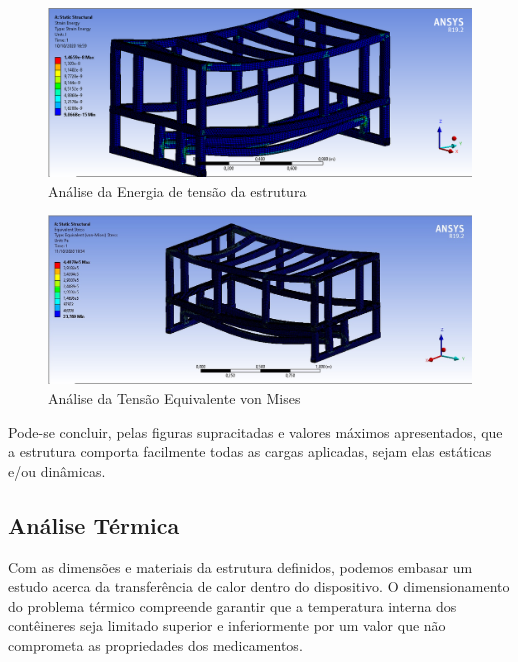 \begin{figure}[ht]
    \centering
    \includegraphics[width=1\textwidth]{figuras/estrutura/AnaliseEstaticaTubular/Energy_tubular.png}
    \caption{Análise da Energia de tensão da estrutura}
    \label{fig:Energy_Strain}
\end{figure}

\begin{figure}[ht]
    \centering
    \includegraphics[width=1\textwidth]{figuras/estrutura/AnaliseEstaticaTubular/Von-Mises Stress_Tubular.jpg}
    \caption{Análise da Tensão Equivalente von Mises}
    \label{fig:Von_Mises_tubular}
\end{figure}

Pode-se concluir, pelas figuras supracitadas e valores máximos apresentados, que a estrutura comporta facilmente todas as cargas aplicadas, sejam elas estáticas e/ou dinâmicas.



\subsection{Análise Térmica} \label{section:AnaliseTermica}


Com as dimensões e materiais da estrutura definidos, podemos embasar um estudo acerca da transferência de calor dentro do dispositivo. O dimensionamento do problema térmico compreende garantir que a temperatura interna dos contêineres seja limitado superior e inferiormente por um valor que não comprometa as propriedades dos medicamentos. 

